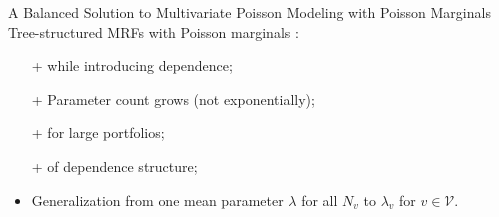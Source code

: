 \documentclass[11pt,xcolor={dvipsnames},hyperref={pdftex,pdfpagemode=UseNone,hidelinks,pdfdisplaydoctitle=true},usepdftitle=false]{beamer}
\begin{document}
\begin{frame}{A Balanced Solution to Multivariate Poisson Modeling with Poisson Marginals}
Tree-structured MRFs with Poisson marginals \citep{cote2025tree}:
\begin{itemize}
        \item[+]  while introducing dependence;
        \vfill
        \item[+] Parameter count grows  
        (not exponentially);
        \vfill
        \item[+]  for large portfolios;
        \vfill
        \item[+]  of dependence structure;
        \vfill
        \pause
        \item Generalization from {one mean parameter} $\lambda$ for all $N_v$ to $\lambda_v$ for  $v \in \mathcal{V}$. 
\end{itemize}
\end{frame}
\end{document}
